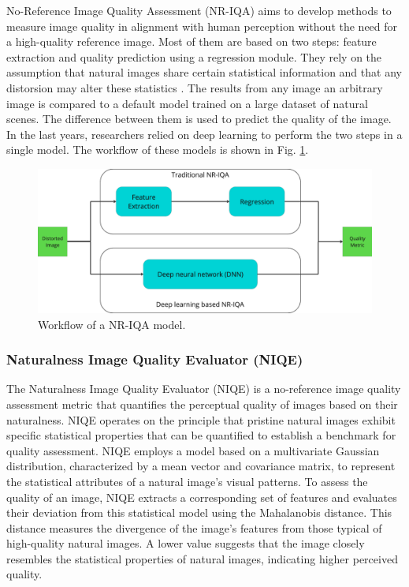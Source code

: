     No-Reference Image Quality Assessment (NR-IQA) aims to develop methods to measure image quality in alignment with human perception without the need for a high-quality reference image. 
    Most of them are based on two steps: feature extraction and quality prediction using a regression module. 
    They rely on the assumption that natural images share certain statistical information and that any distorsion may alter these statistics \cite{niqe}.
    The results from any image an arbitrary image is compared to a default model trained on a large dataset of natural scenes. 
    The difference  between them is used to predict the quality of the image.
    In the last years, researchers relied on deep learning to perform the two steps in a single model. 
    The workflow of these models is shown in Fig. \ref{fig:4-nr-iqa-workflow}.

    \begin{figure}[h!]
        \centering
        \includegraphics[scale=0.25]{Includes/3-NR-IQA.pdf}
        \caption{Workflow of a NR-IQA model.}
        \label{fig:4-nr-iqa-workflow}
    \end{figure}


        

        \subsubsection{Naturalness Image Quality Evaluator (NIQE)}

        
            The Naturalness Image Quality Evaluator (NIQE) \cite{niqe} is a no-reference image quality assessment metric that quantifies the perceptual quality of images based on their naturalness.
            NIQE operates on the principle that pristine natural images exhibit specific statistical properties that can be quantified to establish a benchmark for quality assessment. 
            NIQE employs a model based on a multivariate Gaussian distribution, characterized by a mean vector and covariance matrix, to represent the statistical attributes of a natural image's visual patterns.
            To assess the quality of an image, NIQE extracts a corresponding set of features and evaluates their deviation from this statistical model using the Mahalanobis distance.
            This distance measures the divergence of the image's features from those typical of high-quality natural images.
            A lower value suggests that the image closely resembles the statistical properties of natural images, indicating higher perceived quality.
            
